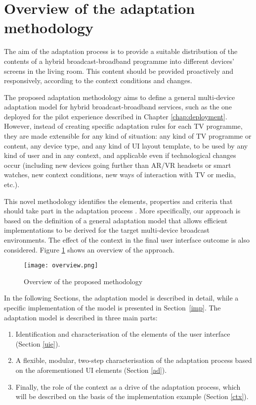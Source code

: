 \section{Overview of the adaptation methodology}\label{ov}

The aim of the adaptation process is to provide a suitable distribution of the contents of a hybrid broadcast-broadband programme into different devices' screens in the living room.
This content should be provided proactively and responsively, according to the context conditions and changes.

The proposed adaptation methodology aims to define a general multi-device adaptation model for hybrid broadcast-broadband services, such as the one deployed for the pilot experience described in Chapter \ref{chap:deployment}. However, instead of creating specific adaptation rules for each TV programme, they are made extensible for any kind of situation: any kind of TV programme or content, any device type, and any kind of UI layout template, to be used by any kind of user and in any context, and applicable even if technological changes occur (including new devices going further than AR/VR headsets or smart watches, new context conditions, new ways of interaction with TV or media, etc.).

This novel methodology identifies the elements, properties and criteria that should take part in the adaptation process \cite{Zorrilla2015} \cite{dominguez2017deployment} \cite{zorrilla2013} \cite{dominguez2018componentizing} \cite{dominguez2019methods}. 
More specifically, our approach is based on the definition of a general adaptation model that allows efficient implementations to be derived for the target multi-device broadcast environments. 
The effect of the context in the final user interface outcome is also considered. 
Figure \ref{fig:overview} shows an overview of the approach.

\begin{figure}	
	\begin{center}
		\texttt{[image: overview.png]}
		\caption{Overview of the proposed methodology}
		\label{fig:overview}
	\end{center}
\end{figure} 


In the following Sections, the adaptation model is described in detail, while a specific implementation of the model is presented in Section~\ref{imp}.
The adaptation model is described in three main parts:
\begin{enumerate}
	\item Identification and characterisation of the elements of the user interface (Section \ref{uie}).
	\item A flexible, modular, two-step characterisation of the adaptation process based on the aforementioned UI elements (Section \ref{ad}). 
	\item Finally, the role of the context as a drive of the adaptation process, which will be described on the basis of the implementation example
	(Section \ref{ctx}).
\end{enumerate}

